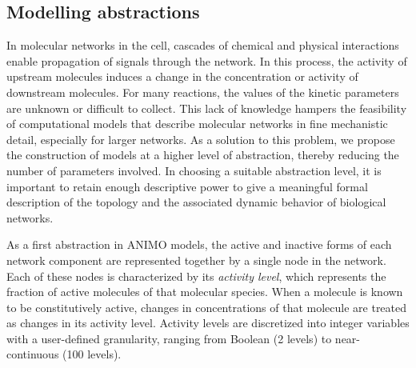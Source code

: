 \subsection{Modelling abstractions}\label{subsec:abstractions}

In molecular networks in the cell, cascades of chemical and physical interactions enable propagation of 
signals through the network. In this process, the activity of upstream molecules induces a change in the 
concentration or activity of downstream molecules. For many reactions, the values of the kinetic parameters 
are unknown or difficult to collect. This lack of knowledge hampers the feasibility 
of computational models that describe molecular networks in fine mechanistic detail, especially for larger networks.
As a solution to this problem, we propose the construction of models at a higher level of abstraction, 
thereby reducing the number of parameters involved. In choosing a suitable abstraction level, it is important to 
retain enough descriptive power to give a meaningful formal description of the topology and the 
associated dynamic behavior of biological networks.

As a first abstraction in ANIMO models, the active and inactive forms of each network component 
are represented together by a single node in the network.
Each of these nodes is characterized by its \emph{activity level}, which
represents the fraction of active molecules of that molecular species. When a molecule is known to be 
constitutively active, changes in concentrations of that molecule are treated as changes in its activity level.
Activity levels are discretized into integer variables with a user-defined granularity, ranging from 
Boolean (2 levels) to near-continuous (100 levels).

